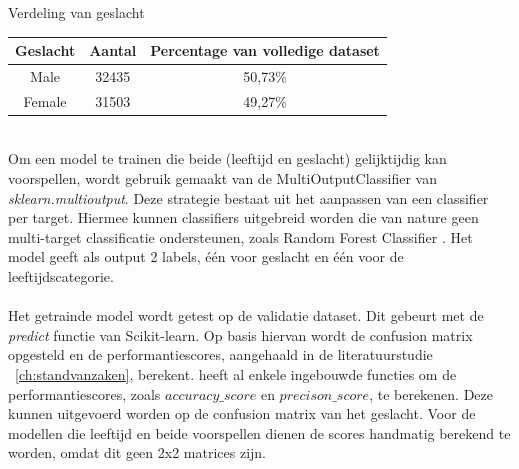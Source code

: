 \begin{center}
     \caption{Verdeling van geslacht}
       \label{tab:geslacht}
    \begin{tabular}{||c | c | c||} 
        \hline
        Geslacht & Aantal & Percentage van volledige dataset  \\ 
        \hline
        Male & 32435 & 50,73\% \\
        \hline
        Female & 31503 & 49,27\% \\
        
    \end{tabular}
\end{center}

\\
Om een model te trainen die beide (leeftijd en geslacht) gelijktijdig kan voorspellen, wordt gebruik gemaakt van de MultiOutputClassifier van \textit{sklearn.multioutput}. Deze strategie bestaat uit het aanpassen van een classifier per target. Hiermee kunnen classifiers uitgebreid worden die van nature geen multi-target classificatie ondersteunen, zoals Random Forest Classifier \autocite{ScikitLearn2024}. Het model geeft als output 2 labels, één voor geslacht en één voor de leeftijdscategorie. \\
\\ 
Het getrainde model wordt getest op de validatie dataset. Dit gebeurt met de \textit{predict} functie van Scikit-learn. Op basis hiervan wordt de confusion matrix opgesteld en de performantiescores, aangehaald in de literatuurstudie ~\ref{ch:standvanzaken}, berekent. \textcite{ScikitLearn2024} heeft al enkele ingebouwde functies om de performantiescores, zoals $accuracy\_score$ en $precison\_score$, te berekenen. Deze kunnen uitgevoerd worden op de confusion matrix van het geslacht. Voor de modellen die leeftijd en beide voorspellen dienen de scores handmatig berekend te worden, omdat dit geen 2x2 matrices zijn. 

